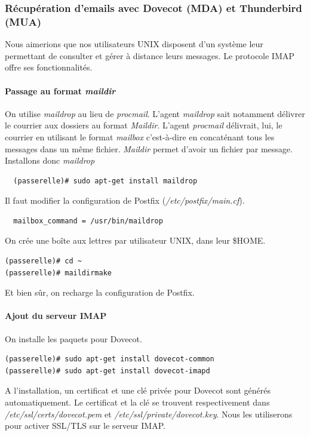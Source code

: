 \documentclass[a4paper]{article}
\begin{document}
\subsubsection{Récupération d'emails avec Dovecot (MDA) et Thunderbird (MUA)}

Nous aimerions que nos utilisateurs UNIX disposent d'un système 
leur permettant de consulter et gérer à distance leurs messages.
Le protocole IMAP offre ses fonctionnalités. 

\paragraph{Passage au format \textit{maildir}}

On utilise \textit{maildrop} au lieu de \textit{procmail}.
L'agent \textit{maildrop} sait notamment délivrer le courrier aux dossiers au format
\textit{Maildir}. L'agent \textit{procmail} délivrait, lui, le courrier
en utilisant le format \textit{mailbox} c'est-à-dire en concaténant
tous les messages dans un même fichier. \textit{Maildir} permet
d'avoir un fichier par message.
Installons donc \textit{maildrop}
\begin{verbatim}
  (passerelle)# sudo apt-get install maildrop
\end{verbatim}

Il faut modifier la configuration de Postfix (\textit{/etc/postfix/main.cf}).
\begin{verbatim}
  mailbox_command = /usr/bin/maildrop
\end{verbatim}

On crée une boîte aux lettres par utilisateur UNIX, dans leur \$HOME.
\begin{verbatim}
(passerelle)# cd ~
(passerelle)# maildirmake
\end{verbatim}

Et bien sûr, on recharge la configuration de Postfix.

\paragraph{Ajout du serveur IMAP}

On installe les paquets pour Dovecot.
\begin{verbatim}
(passerelle)# sudo apt-get install dovecot-common
(passerelle)# sudo apt-get install dovecot-imapd
\end{verbatim}

A l'installation, un certificat et une clé privée pour Dovecot
sont générés automatiquement. Le certificat et la clé
se trouvent respectivement dans \textit{/etc/ssl/certs/dovecot.pem}
et \textit{/etc/ssl/private/dovecot.key}. Nous les utiliserons
pour activer SSL/TLS sur le serveur IMAP.
\end{document}
